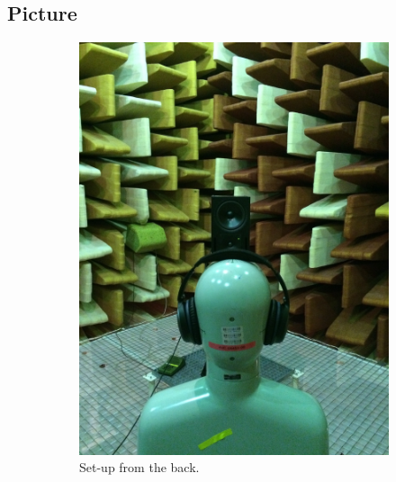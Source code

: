 	
\subsection{Picture}
\begin{figure}[H]
	\centering
	\begin{subfigure}[b]{0.5\textwidth}
		\centering
		\includegraphics[width=\textwidth]{../Journal/Experiments/TestofConsumerHeadphones/Pictures/OtherBrandsSetupBack.jpg}
		\caption{Set-up from the back.}
	\end{subfigure}\qquad
	\begin{subfigure}[b]{0.4\textwidth}

\end{subfigure}
\end{figure}
